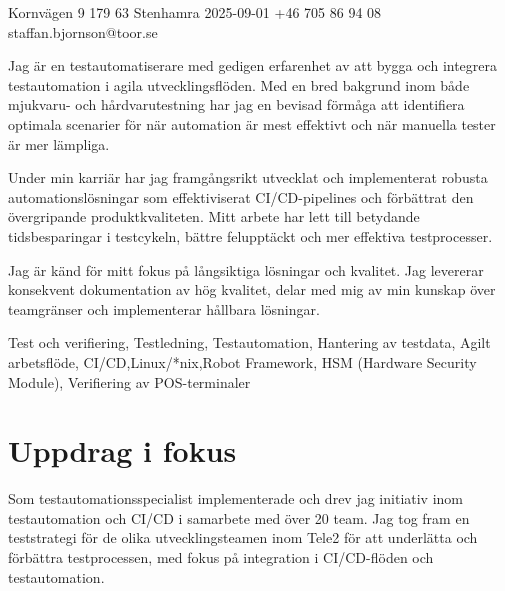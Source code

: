 \documentclass{sobCV}[2015/09/08]
\begin{document}
        {Kornvägen 9}
        {179 63 Stenhamra}
        {2025-09-01}
        {+46 705 86 94 08}
        {staffan.bjornson@toor.se}






   {
        Jag är en testautomatiserare med gedigen erfarenhet av att bygga och integrera testautomation i agila utvecklingsflöden. Med en bred bakgrund inom både mjukvaru- och hårdvarutestning har jag en bevisad förmåga att identifiera optimala scenarier för när automation är mest effektivt och när manuella tester är mer lämpliga.

        Under min karriär har jag framgångsrikt utvecklat och implementerat robusta automationslösningar som effektiviserat CI/CD-pipelines och förbättrat den övergripande produktkvaliteten. Mitt arbete har lett till betydande tidsbesparingar i testcykeln, bättre felupptäckt och mer effektiva testprocesser.

        Jag är känd för mitt fokus på långsiktiga lösningar och kvalitet. Jag levererar konsekvent dokumentation av hög kvalitet, delar med mig av min kunskap över teamgränser och implementerar hållbara lösningar.
   }{
        Test och verifiering,
        Testledning,
        Testautomation,
        Hantering av testdata,
        Agilt arbetsflöde,
        CI/CD,Linux/*nix,Robot Framework,
        HSM (Hardware Security Module),
        Verifiering av POS-terminaler
    }


\section{Uppdrag i fokus}
    Som testautomationsspecialist implementerade och drev jag initiativ inom testautomation och CI/CD i samarbete med över 20 team. Jag tog fram en teststrategi för de olika utvecklingsteamen inom Tele2 för att underlätta och förbättra testprocessen, med fokus på integration i CI/CD-flöden och testautomation.
\end{document}

